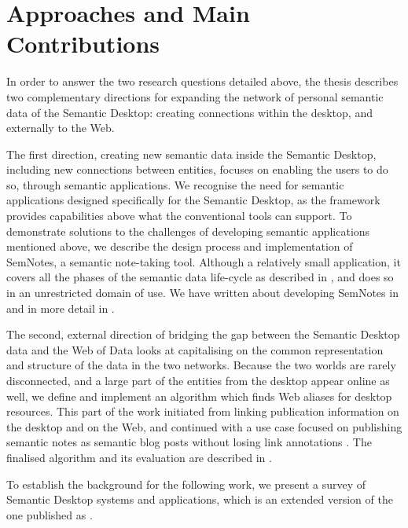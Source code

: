 \section{Approaches and Main Contributions}
\label{sec:contribution}

In order to answer the two research questions detailed above, the thesis describes two complementary directions for expanding the network of personal semantic data of the Semantic Desktop: creating connections within the desktop, and externally to the Web. 

The first direction, creating new semantic data inside the Semantic Desktop, including new connections between entities, focuses on enabling the users to do so, through semantic applications. We recognise the need for semantic applications designed specifically for the Semantic Desktop, as the framework provides capabilities above what the conventional tools can support. To demonstrate solutions to the challenges of developing semantic applications mentioned above, we describe the design process and implementation of SemNotes, a semantic note-taking tool. Although a relatively small application, it covers all the phases of the semantic data life-cycle as described in \cite{MoellerPhDThesis2009}, and does so in an unrestricted domain of use. We have written about developing SemNotes in \cite{Dragan2009a} and in more detail in \cite{Dragan2011a}.

The second, external direction of bridging the gap between the Semantic Desktop data and the Web of Data looks at capitalising on the common representation and structure of the data in the two networks. Because the two worlds are rarely disconnected, and a large part of the entities from the desktop appear online as well, we define and implement an algorithm which finds Web aliases for desktop resources. This part of the work initiated from linking publication information \cite{Groza2009} on the desktop and on the Web, and continued with a use case focused on publishing semantic notes as semantic blog posts without losing link annotations \cite{Dragan2010a}. The finalised algorithm and its evaluation are described in \cite{Dragan2011b}. 

To establish the background for the following work, we present a survey of Semantic Desktop systems and applications, which is an extended version of the one published as \cite{Dragan2012}.

